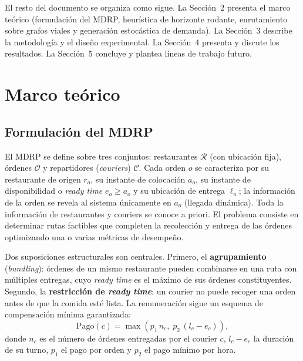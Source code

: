 \documentclass[12pt,letterpaper]{article}
\begin{document}
El resto del documento se organiza como sigue. La Sección~2 presenta el marco
teórico (formulación del MDRP, heurística de horizonte rodante, enrutamiento
sobre grafos viales y generación estocástica de demanda). La Sección~3 describe la
metodología y el diseño experimental. La Sección~4 presenta y discute los
resultados. La Sección~5 concluye y plantea líneas de trabajo futuro.

\section{Marco teórico}

\subsection{Formulación del MDRP}

El MDRP \citep{Reyes2018} se define sobre tres conjuntos: restaurantes
$\mathcal{R}$ (con ubicación fija), órdenes $\mathcal{O}$ y repartidores
(\textit{couriers}) $\mathcal{C}$. Cada orden $o$ se caracteriza por su
restaurante de origen $r_o$, su instante de colocación $a_o$, su instante de
disponibilidad o \textit{ready time} $e_o \ge a_o$ y su ubicación de entrega
$\ell_o$; la información de la orden se revela al sistema únicamente en $a_o$
(llegada dinámica). Toda la información de restaurantes y couriers se conoce a
priori. El problema consiste en determinar rutas factibles que completen la
recolección y entrega de las órdenes optimizando una o varias métricas de
desempeño.

Dos suposiciones estructurales son centrales. Primero, el \textbf{agrupamiento}
(\textit{bundling}): órdenes de un mismo restaurante pueden combinarse en una ruta
con múltiples entregas, cuyo \textit{ready time} es el máximo de sus órdenes
constituyentes. Segundo, la \textbf{restricción de \textit{ready time}}: un
courier no puede recoger una orden antes de que la comida esté lista. La
remuneración sigue un esquema de compensación mínima garantizada:
\begin{equation}
	\text{Pago}(c) = \max\!\left(p_1\, n_c,\; p_2\,(l_c - e_c)\right),
	\label{eq:comp}
\end{equation}
donde $n_c$ es el número de órdenes entregadas por el courier $c$, $l_c-e_c$ la
duración de su turno, $p_1$ el pago por orden y $p_2$ el pago mínimo por hora.
\end{document}
